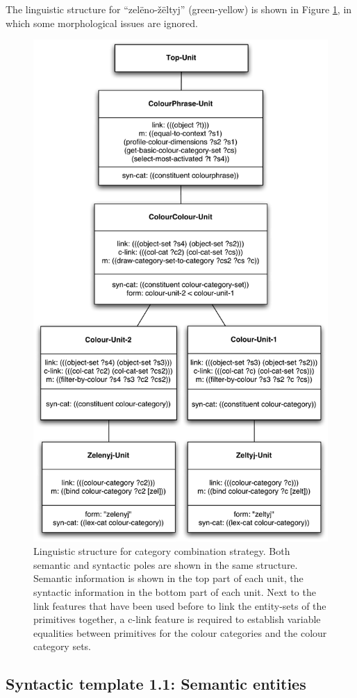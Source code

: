 The linguistic structure for ``zel\"eno-\v z\"eltyj'' (green-yellow)
is shown in Figure \ref{f:ccs-linguistic-structure}, in which some
morphological issues are ignored.

\begin{figure}[htbp]
  \centering
  \includegraphics[width=.70\textwidth]{./category-combination/figures/linguistic-structure.pdf}
  \caption[Linguistic structure for category combination
  strategy]{Linguistic structure for category combination
    strategy. Both semantic and syntactic poles are shown in the same
    structure. Semantic information is shown in the top part of each
    unit, the syntactic information in the bottom part of each
    unit. Next to the link features that have been used before to link
    the entity-sets of the primitives together, a c-link feature is
    required to establish variable equalities between primitives for
    the colour categories and the colour category sets.}
  \label{f:ccs-linguistic-structure}
\end{figure}

\subsection{Syntactic template 1.1: Semantic entities}

